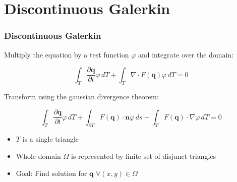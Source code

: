 \documentclass{beamer}
\newcommand{\pd}[2]{\dfrac{\partial #1}{\partial #2}}
\renewcommand{\phi}{\varphi}
\begin{document}
\section{Discontinuous Galerkin}
\label{sec:basis-functions-intro}

\begin{frame}
  \frametitle{Discontinuous Galerkin}
  Multiply the equation by a test function $\phi$ and integrate over the domain:

  \begin{equation}
    \label{eq:shallow-water-weak-form}
    \int_T \pd {\mathbf{q}}{t} \phi \, dT + \int_T \nabla \cdot F(\mathbf{q}) \phi \, dT = 0
  \end{equation}

  Transform using the gaussian divergence theorem:

  \begin{equation}
    \label{eq:shallow-water-dg}
    \int_T \pd {\mathbf{q}}{t} \phi \, dT +
    \int_{\partial T} F(\mathbf{q}) \cdot \mathbf{n} \phi \, ds -
    \int_T F(\mathbf{q}) \cdot \nabla \phi \, dT = 0
  \end{equation}

  \begin{itemize}
  \item $T$ is a single triangle
  \item Whole domain $\Omega$ is represented by finite set of disjunct triangles
  \item Goal: Find solution for $\mathbf{q}$ $\forall \left(x,y\right) \in \Omega$
  \end{itemize}

\end{frame}
\end{document}
